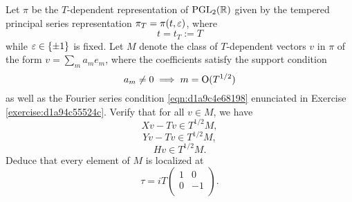 \documentclass[reqno]{amsart} 
\numberwithin{equation}{section}
\begin{document}
\begin{exercise}
  Let $\pi$ be the $T$-dependent representation of $\operatorname{PGL}_2(\mathbb{R})$ given by the tempered principal series representation $\pi_T = \pi(t,\varepsilon)$, where
  \begin{equation*}
    t = t_T := T
  \end{equation*}
  while $\varepsilon \in \{\pm 1\}$ is fixed.  Let $M$ denote the class of $T$-dependent vectors $v$ in $\pi$ of the form $v = \sum_m a_m e_m$, where the coefficients satisfy the support condition
  \begin{equation*}
    a_m \neq 0 \implies m = \operatorname{O}(T^{1/2})
  \end{equation*}
  as well as the Fourier series condition \eqref{eqn:d1a9c4e68198} enunciated in Exercise \ref{exercise:d1a94c55524c}.  Verify that for all $v \in M$, we have
  \begin{equation*}
    X v - T v \in T^{1/2} M,
  \end{equation*}
  \begin{equation*}
    Y v - T v \in T^{1/2}  M,
  \end{equation*}
  \begin{equation*}
    H v \in T^{1/2} M.
  \end{equation*}
  Deduce that every element of $M$ is localized at
  \begin{equation*}
    \tau = i T \begin{pmatrix}
              1 &  0 \\
              0 & -1 \\
            \end{pmatrix}.
          \end{equation*}
        \end{exercise}
\end{document}
